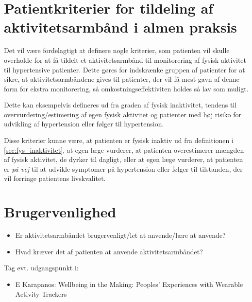 \section{Patientkriterier for tildeling af aktivitetsarmbånd i almen praksis}

\noindent
Det vil være fordelagtigt at definere nogle kriterier, som patienten vil skulle overholde for at få tildelt et aktivitetsarmbånd til monitorering af fysisk aktivitet til hypertensive patienter. Dette gøres for indskrænke gruppen af patienter for at sikre, at aktivitetsarmbåndene gives til patienter, der vil få mest gavn af denne form for ekstra monitorering, så omkostningseffektiviten holdes så lav som muligt.

Dette kan eksempelvis defineres ud fra graden af fysisk inaktivitet, tendens til overvurdering/estimering af egen fysisk aktivitet og patienter med høj risiko for udvikling af hypertension eller følger til hypertension. 

Disse kriterier kunne være, at patienten er fysisk inaktiv ud fra definitionen i \autoref{sec:fys_inaktivitet}, at egen læge vurderer, at patienten overestimerer mængden af fysisk aktivitet, de dyrker til dagligt, eller at egen læge vurderer, at patienten er \textit{på vej} til at udvikle symptomer på hypertension eller følger til tilstanden, der vil forringe patientens livskvalitet.


\section{Brugervenlighed}
\begin{itemize}
\item Er aktivitetsarmbåndet brugervenligt/let at anvende/lære at anvende?
\item Hvad kræver det af patienten at anvende aktivitetsarmbåndet?
\end{itemize}
Tag evt. udgangspunkt i: 
\begin{itemize}
\item E Karapanos: Wellbeing in the Making: Peoples' Experiences with Wearable Activity Trackers
\end{itemize}

